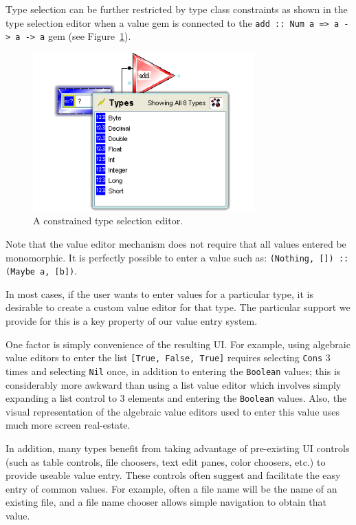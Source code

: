 \documentclass[preprint]{sigplanconf}
\begin{document}
Type selection can be further restricted by type class constraints
as shown in the type selection editor when a value gem is connected to
the {\tt add :: Num a => a -> a -> a} gem (see
Figure~\ref{fig:constrainedTypeSelection}).

\begin{figure}[htb]
  \centering
  \includegraphics[width=20pc]{constrainedTypeSelection.png}
  \caption{A constrained type selection editor.}
  \label{fig:constrainedTypeSelection}
\end{figure}

Note that the value editor mechanism does not require that all values
entered be monomorphic. It is perfectly possible to enter a value such
as: {\tt (Nothing, []) :: (Maybe a, [b])}.

In most cases, if the user wants to enter values for a particular type,
it is desirable to create a custom value editor for that type. The particular support
we provide for this is a key property of our value entry system. 

One factor is simply convenience of the resulting UI. 
For example, using algebraic value editors to enter the list {\tt [True, False, True]} 
requires selecting {\tt Cons} 3 times and selecting {\tt Nil} once, in addition to 
entering the {\tt Boolean} values; this is considerably more awkward than 
using a list value editor which involves simply expanding
a list control to 3 elements and entering the {\tt Boolean} values. 
Also, the visual representation of the algebraic value editors used to enter this value
uses much more screen real-estate.

In addition, many types benefit from taking advantage of pre-existing UI
controls (such as table controls, file choosers, text edit panes, color choosers, etc.)
to provide useable value entry. These controls often suggest and facilitate the easy
entry of common values. For example, often a file name will be the name of an existing file, and
a file name chooser allows simple navigation to obtain that value. 
\end{document}
